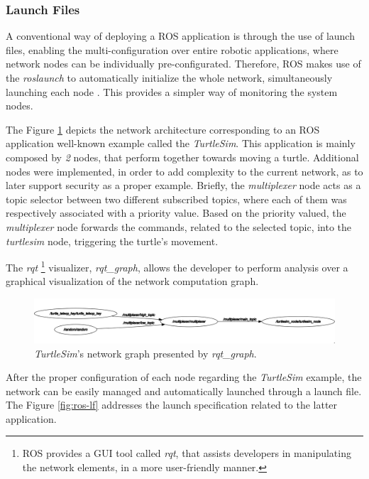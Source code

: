 \subsubsection{Launch Files}

A conventional way of deploying a ROS application is through the use of launch files, enabling the multi-configuration over entire robotic applications, where network nodes can be individually pre-configurated. Therefore, ROS makes use of the \textit{roslaunch} to automatically initialize the whole network, simultaneously launching each node \cite{intro-ros}. This provides a simpler way of monitoring the system nodes. 

The Figure \ref{fig:ts-rqt-graph} depicts the network architecture corresponding to an ROS application well-known example called the \textit{TurtleSim}. This application is mainly composed by \textit{2} nodes, that perform together towards moving a turtle. Additional nodes were implemented, in order to add complexity to the current network, as to later support security as a proper example. Briefly, the \textit{multiplexer} node acts as a topic selector between two different subscribed topics, where each of them was respectively associated with a priority value. Based on the priority valued, the \textit{multiplexer} node forwards the commands, related to the selected topic, into the \textit{turtlesim} node, triggering the turtle's movement. 

The \textit{rqt} \footnote{ROS provides a GUI tool called \textit{rqt}, that assists developers in manipulating the network elements, in a more user-friendly manner.} visualizer, \textit{rqt\_graph}, allows the developer to perform analysis over a graphical visualization of the network computation graph.

\begin{figure}[H]
    \centering
    \includegraphics[width=0.8\linewidth]{img/ts_rqt_graph.png}
    \caption{\textit{TurtleSim}'s network graph presented by \textit{rqt\_graph}.}
    \label{fig:ts-rqt-graph}
\end{figure}

After the proper configuration of each node regarding the \textit{TurtleSim} example, the network can be easily managed and automatically launched through a launch file. The Figure \ref{fig:ros-lf} addresses the launch specification related to the latter application.


